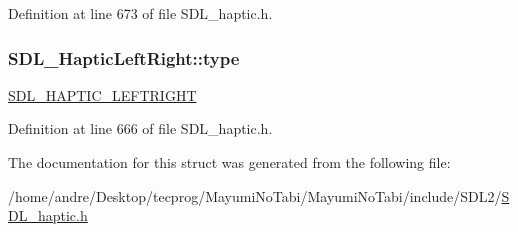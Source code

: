 Definition at line 673 of file S\-D\-L\-\_\-haptic.\-h.

\hypertarget{struct_s_d_l___haptic_left_right_abef79eeb482a8e623e512f0c9635e1a1}{
\subsubsection[{type}]{ S\-D\-L\-\_\-\-Haptic\-Left\-Right\-::type}}\label{struct_s_d_l___haptic_left_right_abef79eeb482a8e623e512f0c9635e1a1}
\hyperlink{_s_d_l__haptic_8h_ae047624d8458ff6400887c37a36f86d3}{S\-D\-L\-\_\-\-H\-A\-P\-T\-I\-C\-\_\-\-L\-E\-F\-T\-R\-I\-G\-H\-T} 

Definition at line 666 of file S\-D\-L\-\_\-haptic.\-h.



The documentation for this struct was generated from the following file\-:\begin{DoxyCompactItemize}
\item 
/home/andre/\-Desktop/tecprog/\-Mayumi\-No\-Tabi/\-Mayumi\-No\-Tabi/include/\-S\-D\-L2/\hyperlink{_s_d_l__haptic_8h}{S\-D\-L\-\_\-haptic.\-h}\end{DoxyCompactItemize}
